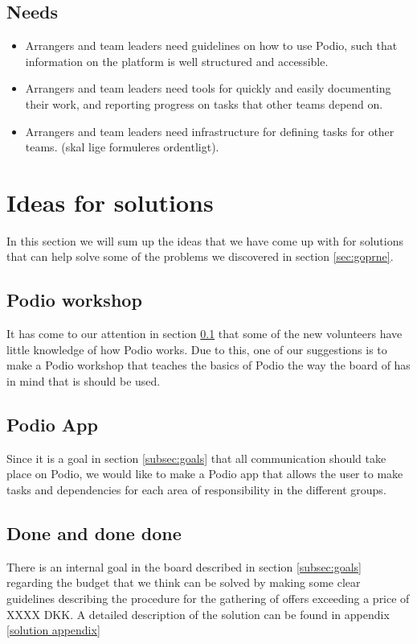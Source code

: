 \subsection{Needs}
\label{subsec:needs}
\begin{itemize}
    \item Arrangers and team leaders need guidelines on how to use Podio, such that information on the platform is well structured and accessible.
    \item Arrangers and team leaders need tools for quickly and easily documenting their work, and reporting progress on tasks that other teams depend on.
    \item Arrangers and team leaders need infrastructure for defining tasks for other teams. (skal lige formuleres ordentligt).
\end{itemize}

\section{Ideas for solutions}
\label{sec:ideas}
In this section we will sum up the ideas that we have come up with for solutions
that can help solve some of the problems we discovered in section \ref{sec:goprne}.

\subsection{Podio workshop}
It has come to our attention in section \ref{subsec:needs} that
some of the new volunteers have little knowledge of how Podio works. Due to
this, one of our suggestions is to make a Podio workshop that teaches the basics
of Podio the way the board of \mil has in mind that is should be used.

\subsection{Podio App}
Since it is a goal in section \ref{subsec:goals} that all communication should take place
on Podio, we would like to make a Podio app that allows the user to make tasks
and dependencies for each area of responsibility in the different groups.

\subsection{Done and done done}
There is an internal goal in the board described in section \ref{subsec:goals} regarding the
budget that we think can be solved by making some clear guidelines describing
the procedure for the gathering of offers exceeding a price of XXXX DKK. A
detailed description of the solution can be found in appendix \ref{solution
appendix}

